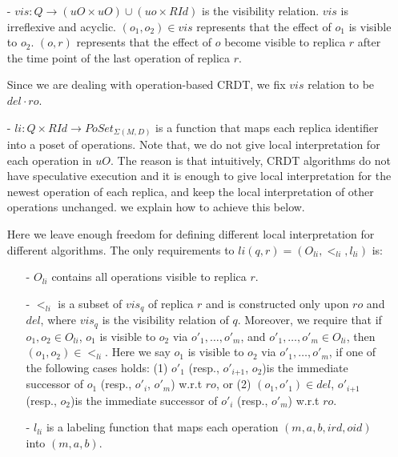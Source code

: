 {\begin{itemize}
\item[-] $vis : Q \rightarrow (uO \times uO) \cup (uo \times RId)$ is the visibility relation. $vis$ is irreflexive and acyclic. $(o_1,o_2) \in vis$ represents that the effect of $o_1$ is visible to $o_2$. $(o,r)$ represents that the effect of $o$ become visible to replica $r$ after the time point of the last operation of replica $r$.

    Since we are dealing with operation-based CRDT, we fix $vis$ relation to be $del \cdot ro$.

\item[-] $li: Q \times RId \rightarrow PoSet_{\Sigma(M,D)}$ is a function that maps each replica identifier into a poset of operations. Note that, we do not give local interpretation for each operation in $uO$. The reason is that intuitively, CRDT algorithms do not have speculative execution and it is enough to give local interpretation for the newest operation of each replica, and keep the local interpretation of other operations unchanged. we explain how to achieve this below.

    Here we leave enough freedom for defining different local interpretation for different algorithms. The only requirements to $li(q,r) = (O_{li},<_{li},l_{li})$ is:

    \begin{itemize}
    \setlength{\itemsep}{0.5pt}
    \item[-] $O_{li}$ contains all operations visible to replica $r$.

    \item[-] $<_{li}$ is a subset of $vis_q$ of replica $r$ and is constructed only upon $ro$ and $del$, where $vis_q$ is the visibility relation of $q$. Moreover, we require that if $o_1,o_2 \in O_{li}$, $o_1$ is visible to $o_2$ via $o'_1,\ldots,o'_m$, and $o'_1,\ldots,o'_m \in O_{li}$, then $(o_1,o_2) \in <_{li}$. Here we say $o_1$ is visible to $o_2$ via $o'_1,\ldots,o'_m$, if one of the following cases holds: (1) $o'_1$ (resp., $o'_{\textit{i+1}}$, $o_2$)is the immediate successor of $o_1$ (resp., $o'_i$, $o'_m$) w.r.t $ro$, or (2) $(o_1,o'_1) \in del$, $o'_{\textit{i+1}}$ (resp., $o_2$)is the immediate successor of $o'_i$ (resp., $o'_m$) w.r.t $ro$.

    \item[-] $l_{li}$ is a labeling function that maps each operation $(m,a,b,ird,oid)$ into $(m,a,b)$.
    \end{itemize}


\end{itemize}}
